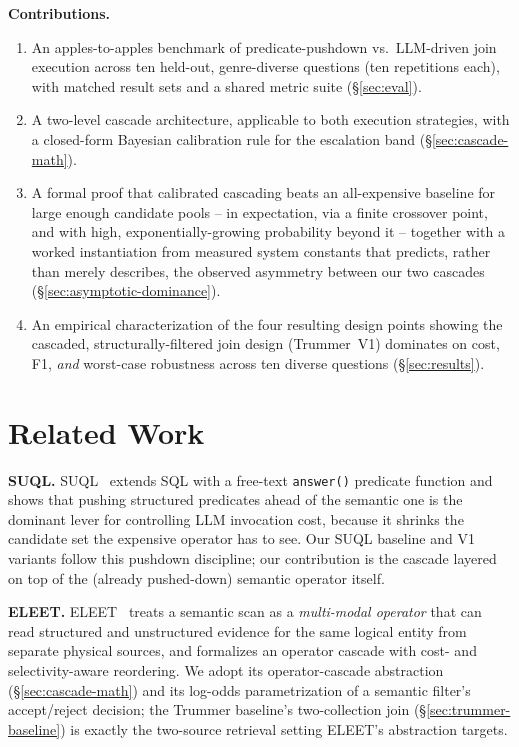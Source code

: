 \documentclass[sigconf,natbib=false]{acmart}
\begin{document}
\smallskip\noindent\textbf{Contributions.}
\begin{enumerate}
\item An apples-to-apples benchmark of predicate-pushdown vs.\ LLM-driven join execution across ten held-out, genre-diverse questions (ten repetitions each), with matched result sets and a shared metric suite (\S\ref{sec:eval}).
\item A two-level cascade architecture, applicable to both execution strategies, with a closed-form Bayesian calibration rule for the escalation band (\S\ref{sec:cascade-math}).
\item A formal proof that calibrated cascading beats an all-expensive baseline for large enough candidate pools -- in expectation, via a finite crossover point, and with high, exponentially-growing probability beyond it -- together with a worked instantiation from measured system constants that predicts, rather than merely describes, the observed asymmetry between our two cascades (\S\ref{sec:asymptotic-dominance}).
\item An empirical characterization of the four resulting design points showing the cascaded, structurally-filtered join design (Trummer~V1) dominates on cost, F1, \emph{and} worst-case robustness across ten diverse questions (\S\ref{sec:results}).
\end{enumerate}

\section{Related Work}
\label{sec:related}

\textbf{SUQL.} SUQL~\cite{suql} extends SQL with a free-text \texttt{answer()} predicate function and shows that pushing structured predicates ahead of the semantic one is the dominant lever for controlling LLM invocation cost, because it shrinks the candidate set the expensive operator has to see. Our SUQL baseline and V1 variants follow this pushdown discipline; our contribution is the cascade layered on top of the (already pushed-down) semantic operator itself.

\textbf{ELEET.} ELEET~\cite{eleet} treats a semantic scan as a \emph{multi-modal operator} that can read structured and unstructured evidence for the same logical entity from separate physical sources, and formalizes an operator cascade with cost- and selectivity-aware reordering. We adopt its operator-cascade abstraction (\S\ref{sec:cascade-math}) and its log-odds parametrization of a semantic filter's accept/reject decision; the Trummer baseline's two-collection join (\S\ref{sec:trummer-baseline}) is exactly the two-source retrieval setting ELEET's abstraction targets.
\end{document}
